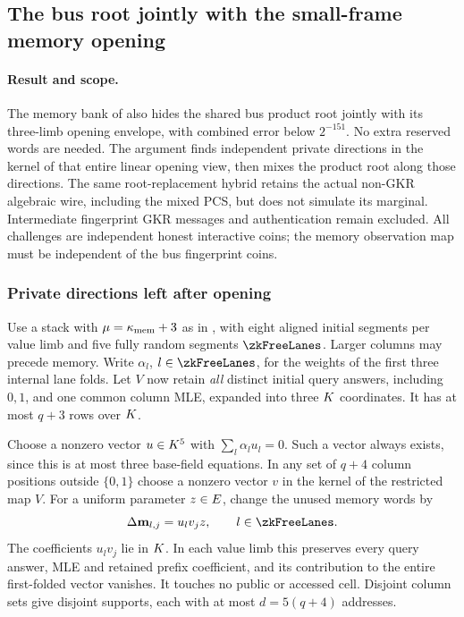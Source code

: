 \subsection{The bus root jointly with the small-frame memory opening}\label{note:zk-memory-root}

\paragraph{Result and scope.} The memory bank of  also hides the shared bus product root jointly with its three-limb opening envelope, with combined error below $2^{-151}$. No extra reserved words are needed. The argument finds independent private directions in the kernel of that entire linear opening view, then mixes the product root along those directions. The same root-replacement hybrid retains the actual non-GKR algebraic wire, including the mixed PCS, but does not simulate its marginal. Intermediate fingerprint GKR messages and authentication remain excluded. All challenges are independent honest interactive coins; the memory observation map must be independent of the bus fingerprint coins.

\subsubsection{Private directions left after opening}

Use a stack with $\mu=\kappa_{\mathrm{mem}}+3$ as in , with eight aligned initial segments per value limb and five fully random segments $\zkFreeLanes$. Larger columns may precede memory. Write $\alpha_l$, $l\in\zkFreeLanes$, for the weights of the first three internal lane folds. Let $V$ now retain \emph{all} distinct initial query answers, including $0,1$, and one common column MLE, expanded into three $K$ coordinates. It has at most $q+3$ rows over $K$.

Choose a nonzero vector $u\in K^5$ with $\sum_l\alpha_lu_l=0$. Such a vector always exists, since this is at most three base-field equations. In any set of $q+4$ column positions outside $\{0,1\}$ choose a nonzero vector $v$ in the kernel of the restricted map $V$. For a uniform parameter $z\in E$, change the unused memory words by
\[
 \Delta\mem_{l,j}=u_l v_j z,
 \qquad l\in\zkFreeLanes.
\]
The coefficients $u_lv_j$ lie in $K$. In each value limb this preserves every query answer, MLE and retained prefix coefficient, and its contribution to the entire first-folded vector vanishes. It touches no public or accessed cell. Disjoint column sets give disjoint supports, each with at most $d=5(q+4)$ addresses.

